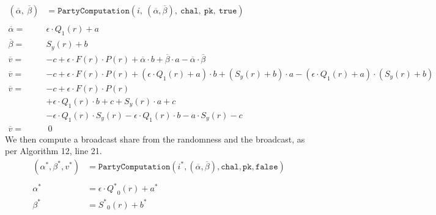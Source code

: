 \documentclass[twoside,11pt]{report}
\theoremstyle{definition}
\theoremstyle{plain}
\begin{document}
\begin{align*}
  (\overline{\alpha},\ \overline{\beta})         & =
  \texttt{PartyComputation}(i,\ (\overline{\alpha}, \overline{\beta}),\ \texttt{chal},\ \texttt{pk},\ \texttt{true})                                                                                   \\\\
  \overline{\alpha}                         =    & \epsilon \cdot Q_1(r) + a                                                                                                                           \\
  \overline{\beta}                          =    & S_y(r)  + b                                                                                                                                         \\
  \overline{v}                            =      & -c + \epsilon \cdot F(r) \cdot P(r) + \overline{\alpha} \cdot b + \overline{\beta} \cdot a  - \overline{\alpha} \cdot \overline{\beta}              \\
  \overline{v}                            =      & -c + \epsilon \cdot F(r) \cdot P(r) + (\epsilon \cdot Q_1(r) + a) \cdot b + (S_y(r)  + b) \cdot a  - (\epsilon \cdot Q_1(r) + a) \cdot (S_y(r) + b) \\
  \overline{v}                            =      & -c + \epsilon \cdot F(r) \cdot P(r)                                                                                                                 \\
                                                 & + \epsilon \cdot Q_1(r) \cdot b + c + S_y(r) \cdot a + c                                                                                            \\
                                                 & - \epsilon \cdot Q_1(r) \cdot S_y(r) - \epsilon \cdot Q_1(r) \cdot b - a \cdot S_y(r) - c                                                           \\
  \overline{v}                                 = & \ 0
\end{align*}
We then compute a broadcast share from the randomness and the broadcast, as per Algorithm 12, line 21.
\begin{align*}
  (\alpha^*, \beta^*, v^*) & = \texttt{PartyComputation}(i^*, (\overline{\alpha},
  \overline{\beta}), \texttt{chal}, \texttt{pk}, \texttt{false})                  \\\\
  \alpha^*                 & = \epsilon \cdot {Q^*}_0(r) + a^*                    \\
  \beta^*                  & =  {S^*}_0(r) + b^*
\end{align*}
\end{document}
